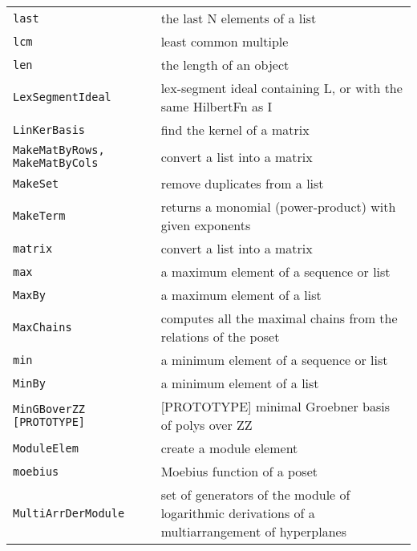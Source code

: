 \documentclass[a4paper]{mybook}
\begin{document}
\begin{center}
\begin{longtable}{ll}
{\verb~last~} &
      the last N elements of a list\\
   
{\verb~lcm~} &
      least common multiple\\
   
{\verb~len~} &
      the length of an object\\
   
{\verb~LexSegmentIdeal~} &
      lex-segment ideal containing L, or with the same HilbertFn as I\\
   
{\verb~LinKerBasis~} &
      find the kernel of a matrix\\
   
{\verb~MakeMatByRows, MakeMatByCols~} &
      convert a list into a matrix\\
   
{\verb~MakeSet~} &
      remove duplicates from a list\\
   
{\verb~MakeTerm~} &
      returns a monomial (power-product) with given exponents\\
   
{\verb~matrix~} &
      convert a list into a matrix\\
   
{\verb~max~} &
      a maximum element of a sequence or list\\
   
{\verb~MaxBy~} &
      a maximum element of a list\\
   
{\verb~MaxChains~} &
      computes all the maximal chains from the relations of the poset\\
   
{\verb~min~} &
      a minimum element of a sequence or list\\
   
{\verb~MinBy~} &
      a minimum element of a list\\
   
{\verb~MinGBoverZZ [PROTOTYPE]~} &
      [PROTOTYPE] minimal Groebner basis of polys over ZZ\\
   
{\verb~ModuleElem~} &
      create a module element\\
   
{\verb~moebius~} &
      Moebius function of a poset\\
   
{\verb~MultiArrDerModule~} &
      set of generators of the module of logarithmic derivations of a multiarrangement of hyperplanes\\
   

\end{longtable}
\end{center}
\end{document}

